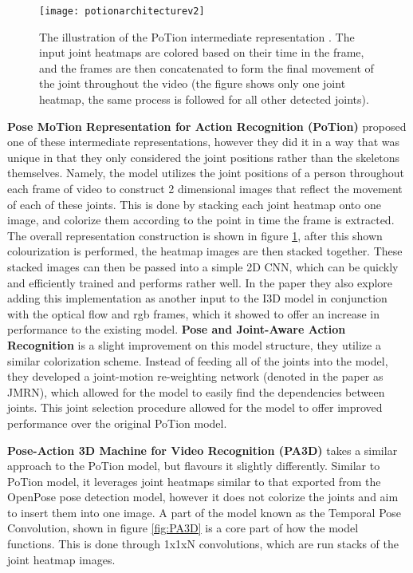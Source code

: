 \begin{figure}[ht]
	\texttt{[image: potionarchitecturev2]}
	\centering
	\caption{The illustration of the PoTion intermediate representation \cite{potion}. The input joint heatmaps are colored based on their time in the frame, and the frames are then concatenated to form the final movement of the joint throughout the video (the figure shows only one joint heatmap, the same process is followed for all other detected joints).}
	\label{fig:potion-architecture}
\end{figure}

\textbf{Pose MoTion Representation for Action Recognition (PoTion)} \cite{potion} proposed one of these intermediate representations, however they did it in a way that was unique in that they only considered the joint positions rather than the skeletons themselves. Namely, the model utilizes the joint positions of a person throughout each frame of video to construct 2 dimensional images that reflect the movement of each of these joints. This is done by stacking each joint heatmap onto one image, and colorize them according to the point in time the frame is extracted.  The overall representation construction is shown in figure \ref{fig:potion-architecture}, after this shown colourization is performed, the heatmap images are then stacked together. These stacked images can then be passed into a simple 2D CNN, which can be quickly and efficiently trained and performs rather well. In the paper they also explore adding this implementation as another input to the I3D \cite{i3d} model in conjunction with the optical flow and rgb frames, which it showed to offer an increase in performance to the existing model. \textbf{Pose and Joint-Aware Action Recognition} \cite{poseandjointaware} is a slight improvement on this model structure, they utilize a similar colorization scheme. Instead of feeding all of the joints into the model, they developed a joint-motion re-weighting network (denoted in the paper as JMRN), which allowed for the model to easily find the dependencies between joints. This joint selection procedure allowed for the model to offer improved performance over the original PoTion model.

\textbf{Pose-Action 3D Machine for Video Recognition (PA3D)} \cite{PA3D} takes a similar approach to the PoTion model, but flavours it slightly differently. Similar to PoTion model, it leverages joint heatmaps similar to that exported from the OpenPose pose detection model, however it does not colorize the joints and aim to insert them into one image. A part of the model known as the Temporal Pose Convolution, shown in figure \ref{fig:PA3D} is a core part of how the model functions. This is done through 1x1xN convolutions, which are run stacks of the joint heatmap images.

